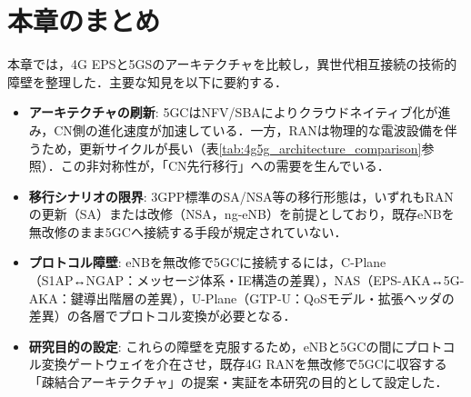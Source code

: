 \section{本章のまとめ}

本章では，4G EPSと5GSのアーキテクチャを比較し，異世代相互接続の技術的障壁を整理した．主要な知見を以下に要約する．

\begin{itemize}
    \item \textbf{アーキテクチャの刷新}: 5GCはNFV/SBAによりクラウドネイティブ化が進み，CN側の進化速度が加速している．一方，RANは物理的な電波設備を伴うため，更新サイクルが長い（表\ref{tab:4g5g_architecture_comparison}参照）．この非対称性が，「CN先行移行」への需要を生んでいる．
    \item \textbf{移行シナリオの限界}: 3GPP標準のSA/NSA等の移行形態は，いずれもRANの更新（SA）または改修（NSA，ng-eNB）を前提としており，既存eNBを無改修のまま5GCへ接続する手段が規定されていない．
    \item \textbf{プロトコル障壁}: eNBを無改修で5GCに接続するには，C-Plane（S1AP↔NGAP：メッセージ体系・IE構造の差異），NAS（EPS-AKA↔5G-AKA：鍵導出階層の差異），U-Plane（GTP-U：QoSモデル・拡張ヘッダの差異）の各層でプロトコル変換が必要となる．
    \item \textbf{研究目的の設定}: これらの障壁を克服するため，eNBと5GCの間にプロトコル変換ゲートウェイを介在させ，既存4G RANを無改修で5GCに収容する「疎結合アーキテクチャ」の提案・実証を本研究の目的として設定した．
\end{itemize}


